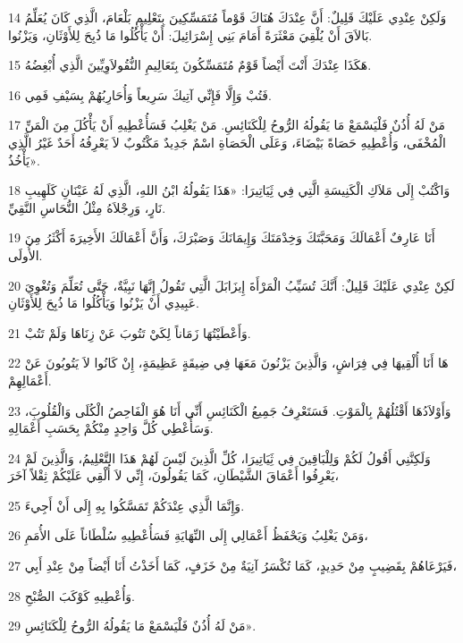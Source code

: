 \par 14 وَلَكِنْ عِنْدِي عَلَيْكَ قَلِيلٌ: أَنَّ عِنْدَكَ هُنَاكَ قَوْماً مُتَمَسِّكِينَ بِتَعْلِيمِ بَلْعَامَ، الَّذِي كَانَ يُعَلِّمُ بَالاَقَ أَنْ يُلْقِيَ مَعْثَرَةً أَمَامَ بَنِي إِسْرَائِيلَ: أَنْ يَأْكُلُوا مَا ذُبِحَ لِلأَوْثَانِ، وَيَزْنُوا.
\par 15 هَكَذَا عِنْدَكَ أَنْتَ أَيْضاً قَوْمٌ مُتَمَسِّكُونَ بِتَعَالِيمِ النُّقُولاَوِيِّينَ الَّذِي أُبْغِضُهُ.
\par 16 فَتُبْ وَإِلَّا فَإِنِّي آتِيكَ سَرِيعاً وَأُحَارِبُهُمْ بِسَيْفِ فَمِي.
\par 17 مَنْ لَهُ أُذُنٌ فَلْيَسْمَعْ مَا يَقُولُهُ الرُّوحُ لِلْكَنَائِسِ. مَنْ يَغْلِبُ فَسَأُعْطِيهِ أَنْ يَأْكُلَ مِنَ الْمَنِّ الْمُخْفَى، وَأُعْطِيهِ حَصَاةً بَيْضَاءَ، وَعَلَى الْحَصَاةِ اسْمٌ جَدِيدٌ مَكْتُوبٌ لاَ يَعْرِفُهُ أَحَدٌ غَيْرُ الَّذِي يَأْخُذُ».
\par 18 وَاكْتُبْ إِلَى مَلاَكِ الْكَنِيسَةِ الَّتِي فِي ثَِيَاتِيرَا: «هَذَا يَقُولُهُ ابْنُ اللهِ، الَّذِي لَهُ عَيْنَانِ كَلَهِيبِ نَارٍ، وَرِجْلاَهُ مِثْلُ النُّحَاسِ النَّقِيِّ.
\par 19 أَنَا عَارِفٌ أَعْمَالَكَ وَمَحَبَّتَكَ وَخِدْمَتَكَ وَإِيمَانَكَ وَصَبْرَكَ، وَأَنَّ أَعْمَالَكَ الأَخِيرَةَ أَكْثَرُ مِنَ الأُولَى.
\par 20 لَكِنْ عِنْدِي عَلَيْكَ قَلِيلٌ: أَنَّكَ تُسَيِّبُ الْمَرْأَةَ إِيزَابَلَ الَّتِي تَقُولُ إِنَّهَا نَبِيَّةٌ، حَتَّى تُعَلِّمَ وَتُغْوِيَ عَبِيدِي أَنْ يَزْنُوا وَيَأْكُلُوا مَا ذُبِحَ لِلأَوْثَانِ.
\par 21 وَأَعْطَيْتُهَا زَمَاناً لِكَيْ تَتُوبَ عَنْ زِنَاهَا وَلَمْ تَتُبْ.
\par 22 هَا أَنَا أُلْقِيهَا فِي فِرَاشٍ، وَالَّذِينَ يَزْنُونَ مَعَهَا فِي ضِيقَةٍ عَظِيمَةٍ، إِنْ كَانُوا لاَ يَتُوبُونَ عَنْ أَعْمَالِهِمْ.
\par 23 وَأَوْلاَدُهَا أَقْتُلُهُمْ بِالْمَوْتِ. فَسَتَعْرِفُ جَمِيعُ الْكَنَائِسِ أَنِّي أَنَا هُوَ الْفَاحِصُ الْكُلَى وَالْقُلُوبَِ، وَسَأُعْطِي كُلَّ وَاحِدٍ مِنْكُمْ بِحَسَبِ أَعْمَالِهِ.
\par 24 وَلَكِنَّنِي أَقُولُ لَكُمْ وَلِلْبَاقِينَ فِي ثَِيَاتِيرَا، كُلِّ الَّذِينَ لَيْسَ لَهُمْ هَذَا التَّعْلِيمُ، وَالَّذِينَ لَمْ يَعْرِفُوا أَعْمَاقَ الشَّيْطَانِ، كَمَا يَقُولُونَ، إِنِّي لاَ أُلْقِي عَلَيْكُمْ ثِقْلاً آخَرَ،
\par 25 وَإِنَّمَا الَّذِي عِنْدَكُمْ تَمَسَّكُوا بِهِ إِلَى أَنْ أَجِيءَ.
\par 26 وَمَنْ يَغْلِبُ وَيَحْفَظُ أَعْمَالِي إِلَى النِّهَايَةِ فَسَأُعْطِيهِ سُلْطَاناً عَلَى الأُمَمِ،
\par 27 فَيَرْعَاهُمْ بِقَضِيبٍ مِنْ حَدِيدٍ، كَمَا تُكْسَرُ آنِيَةٌ مِنْ خَزَفٍ، كَمَا أَخَذْتُ أَنَا أَيْضاً مِنْ عِنْدِ أَبِي،
\par 28 وَأُعْطِيهِ كَوْكَبَ الصُّبْحِ.
\par 29 مَنْ لَهُ أُذُنٌ فَلْيَسْمَعْ مَا يَقُولُهُ الرُّوحُ لِلْكَنَائِسِ».

